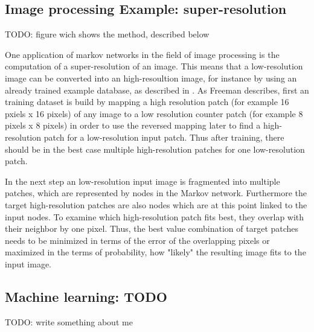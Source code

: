 \subsection{Image processing Example: super-resolution}

TODO: figure wich shows the method, described below

One application of markov networks in the field of image processing is the computation of a super-resolution of an image. This means that a low-resolution image can be converted into an high-resoultion image, for instance by using an already trained example database, as described in \cite{freeman2002example}. As Freeman describes, first an training dataset is build by mapping a high resolution patch (for example 16 pxiels x 16 pixels) of any image to a low resolution counter patch (for example 8 pixels x 8 pixels) in order to use the reversed mapping later to find a high-resolution patch for a low-resolution input patch. Thus after training, there should be in the best case multiple high-resolution patches for one low-resolution patch.

In the next step an low-resolution input image is fragmented into multiple patches, which are represented by nodes in the Markov network. Furthermore the target high-resolution patches are also nodes which are at this point linked to the input nodes. To examine which high-resolution patch fits best, they overlap with their neighbor by one pixel. Thus, the best value combination of target patches needs to be minimized in terms of the error of the overlapping pixels or maximized in the terms of probability, how "likely" the resulting image fits to the input image.

\subsection{Machine learning: TODO}

TODO: write something about me